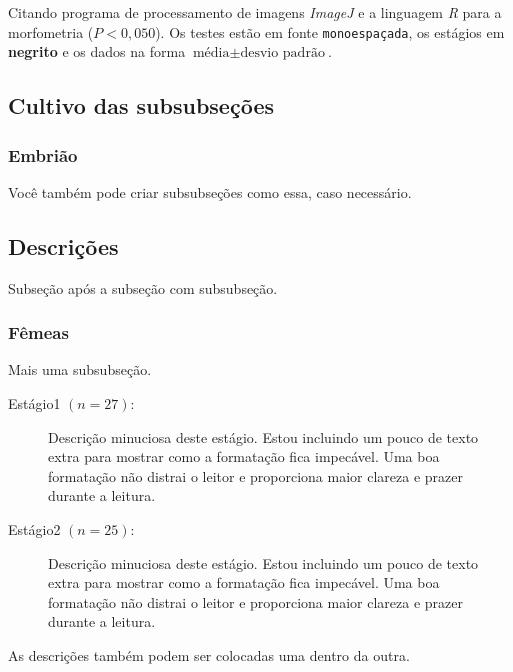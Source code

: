 Citando programa de processamento de imagens \emph{ImageJ} \cite{Rasband1997} e a linguagem \emph{R} \cite{R2005} para a morfometria ($P<0,050$).
Os testes estão em fonte \texttt{monoespaçada}, os estágios em \textbf{negrito} e os dados na forma $\text{média} \pm \text{desvio padrão}$.
\subsection{Cultivo das subsubseções}\label{cap2:mem:gametas}

\subsubsection{Embrião}

Você também pode criar subsubseções como essa, caso necessário.

\subsection{Descrições}\label{cap2:mem:micro}

Subseção após a subseção com subsubseção.

\subsubsection{Fêmeas}\label{cap3:res:femeas}

Mais uma subsubseção.

\begin{description}
  \item[Estágio1 $(n=27)$:] Descrição minuciosa deste estágio.
    Estou incluindo um pouco de texto extra para mostrar como a formatação fica impecável.
    Uma boa formatação não distrai o leitor e proporciona maior clareza e prazer durante a leitura.
  \item[Estágio2 $(n=25)$:] Descrição minuciosa deste estágio.
    Estou incluindo um pouco de texto extra para mostrar como a formatação fica impecável.
    Uma boa formatação não distrai o leitor e proporciona maior clareza e prazer durante a leitura.
\end{description}

As descrições também podem ser colocadas uma dentro da outra.

